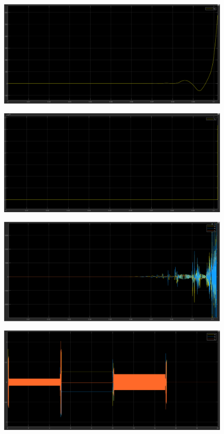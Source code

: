 \documentclass{article}
\begin{document}
\begin{figure}[H]
    \centering
    \includegraphics[width=1\textwidth]{5.2.5.d.1.png}
\end{figure}

\begin{figure}[H]
    \centering
    \includegraphics[width=1\textwidth]{5.2.5.d.2.png}
\end{figure}

\begin{figure}[H]
    \centering
    \includegraphics[width=1\textwidth]{5.2.5.d.3.png}
\end{figure}

\begin{figure}[H]
    \centering
    \includegraphics[width=1\textwidth]{5.2.5.d.4.png}
\end{figure}
\end{document}
